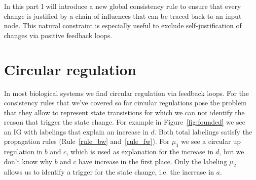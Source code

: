 In this part I will introduce a new global consistency rule to ensure that every change
is justified by a chain of influences that can be traced back to an input node.
This natural constraint is especially useful to exclude self-justification of changes via positive feedback loops.


\section*{Circular regulation}

In most biological systems we find circular regulation via feedback loops.
For the consistency rules that we've covered so far circular regulations pose the problem that
 they allow to represent state transistions for which we can not identify the reason that trigger the state change.
For example in Figure~\ref{fig:founded} we see an IG with labelings that explain an increase in $d$.
Both total labelings satisfy the propagation rules (Rule~\ref{rule_bw} and~\ref{rule_fw}).
For $\mu_1$ we see a circular up regulation in $b$ and $c$, which is used as explanation for the increase in $d$,
 but we don't know why $b$ and $c$ have increase in the first place.
Only the labeling $\mu_{2}$ allows us to identify a trigger for the state change, i.e. the increase in $a$.

